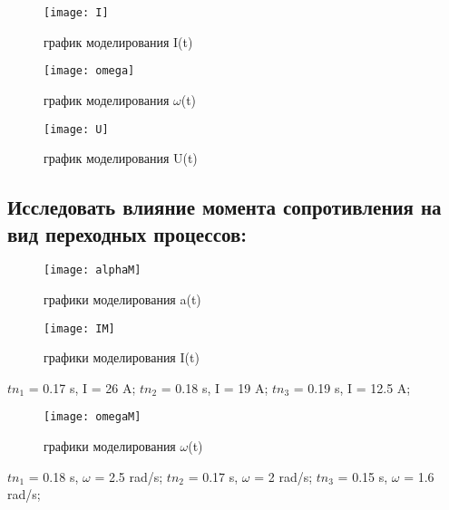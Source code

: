 \begin{figure}[H]
	\begin{center}
		\texttt{[image: I]}
		\caption{график моделирования I(t)} 
		\label{pic:pic_3} %
	\end{center}
\end{figure}

\begin{figure}[H]
	\begin{center}
		\texttt{[image: omega]}
		\caption{график моделирования $\omega$(t)} 
		\label{pic:pic_4} %
	\end{center}
\end{figure}

\begin{figure}[H]
	\begin{center}
		\texttt{[image: U]}
		\caption{график моделирования U(t)} 
		\label{pic:pic_5} %
	\end{center}
\end{figure}

\subsection{Исследовать влияние момента сопротивления на вид переходных процессов:}

\begin{figure}[H]
	\begin{center}
		\texttt{[image: alphaM]}
		\caption{графики моделирования a(t)} 
		\label{pic:pic_2} %
	\end{center}
\end{figure}

\begin{figure}[H]
	\begin{center}
		\texttt{[image: IM]}
		\caption{графики моделирования I(t)} 
		\label{pic:pic_3} %
	\end{center}
\end{figure}
$tn_1$ = 0.17 s, I = 26 A;
$tn_2$ = 0.18 s, I = 19 A;
$tn_3$ = 0.19 s, I = 12.5 A;

\begin{figure}[H]
	\begin{center}
		\texttt{[image: omegaM]}
		\caption{графики моделирования $\omega$(t)} 
		\label{pic:pic_4} %
	\end{center}
\end{figure}
$tn_1$ = 0.18 s, $\omega$ = 2.5 rad/s;
$tn_2$ = 0.17 s, $\omega$ = 2 rad/s;
$tn_3$ = 0.15 s, $\omega$ = 1.6 rad/s;


